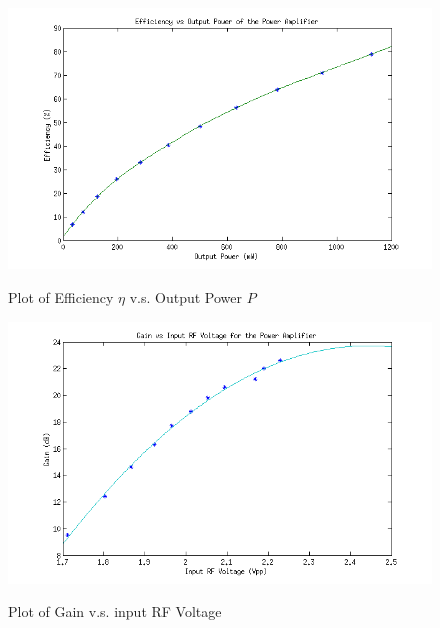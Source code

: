 \begin{figure}[h!]
  \centering
  \includegraphics[scale=0.5]{./img/plot1.png}
    \label{fig:efficiencyvpower}
    \caption{Plot of Efficiency $\eta$ v.s. Output Power $P$}
\end{figure}

\begin{figure}[h!]
  \centering
  \includegraphics[scale=0.5]{./img/plot2.png}
    \label{fig:gainvRFvolt}
    \caption{Plot of Gain v.s. input RF Voltage}
\end{figure}
